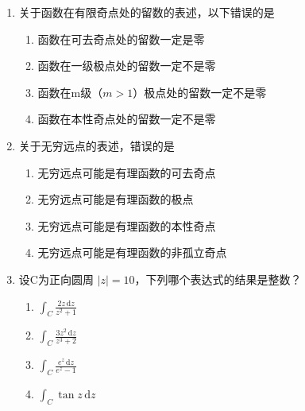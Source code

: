 \documentclass[openany,oneside]{ctexbook}
\begin{document}
\begin{enumerate}[label=\arabic*., start=1]
\item 关于函数在有限奇点处的留数的表述，以下错误的是
\begin{enumerate}[label=\Alph*.]
\item 函数在可去奇点处的留数一定是零
\item 函数在一级极点处的留数一定不是零
\item 函数在m级（\(m > 1\)）极点处的留数一定不是零
\item 函数在本性奇点处的留数一定不是零
\end{enumerate}

\item 关于无穷远点的表述，错误的是
\begin{enumerate}[label=\Alph*.]
\item 无穷远点可能是有理函数的可去奇点
\item 无穷远点可能是有理函数的极点
\item 无穷远点可能是有理函数的本性奇点
\item 无穷远点可能是有理函数的非孤立奇点
\end{enumerate}

\item 设C为正向圆周 \(|z| = 10\)，下列哪个表达式的结果是整数？
\begin{enumerate}[label=\Alph*.]
\item \(\displaystyle \int_C \frac{2z \, \mathrm{d}z}{z^2+1}\)
\item \(\displaystyle \int_C \frac{3z^2 \, \mathrm{d}z}{z^3+2}\)
\item \(\displaystyle \int_C \frac{e^z \, \mathrm{d}z}{e^z - 1}\)
\item \(\displaystyle \int_C \tan z \, \mathrm{d}z\)
\end{enumerate}


\end{enumerate}
\end{document}
